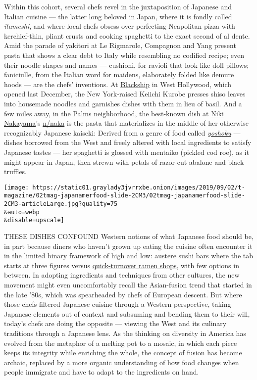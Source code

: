 Within this cohort, several chefs revel in the juxtaposition of Japanese
and Italian cuisine --- the latter long beloved in Japan, where it is
fondly called \emph{itameshi}, and where local chefs obsess over
perfecting Neapolitan pizza with kerchief-thin, pliant crusts and
cooking spaghetti to the exact second of al dente. Amid the parade of
yakitori at Le Rigmarole, Compagnon and Yang present pasta that shows a
clear debt to Italy while resembling no codified recipe; even their
noodle shapes and names --- cushioni, for ravioli that look like doll
pillows; faniciulle, from the Italian word for maidens, elaborately
folded like demure hoods --- are the chefs' inventions. At
\href{https://www.blackshipla.com/}{Blackship} in West Hollywood, which
opened last December, the New York-raised Keiichi Kurobe presses shiso
leaves into housemade noodles and garnishes dishes with them in lieu of
basil. And a few miles away, in the Palms neighborhood, the best-known
dish at
\href{https://www.nytimes3xbfgragh.onion/2018/05/16/t-magazine/food/female-chefs-rita-sodi-jody-williams-erika-nakamura.html}{Niki
Nakayama}'s \href{https://n-naka.com/}{n/naka} is the pasta that
materializes in the middle of her otherwise recognizably Japanese
kaiseki: Derived from a genre of food called
\href{https://www.nytimes3xbfgragh.onion/2008/03/26/dining/26japan.html}{\emph{yoshoku}}
--- dishes borrowed from the West and freely altered with local
ingredients to satisfy Japanese tastes --- her spaghetti is glossed with
mentaiko (pickled cod roe), as it might appear in Japan, then strewn
with petals of razor-cut abalone and black truffles.

\texttt{[image: https://static01.graylady3jvrrxbe.onion/images/2019/09/02/t-magazine/02tmag-japanamerfood-slide-2CM3/02tmag-japanamerfood-slide-2CM3-articleLarge.jpg?quality=75\\\&auto=webp\\\&disable=upscale]}

THESE DISHES CONFOUND Western notions of what Japanese food should be,
in part because diners who haven't grown up eating the cuisine often
encounter it in the limited binary framework of high and low: austere
sushi bars where the tab starts at three figures versus
\href{https://www.nytimes3xbfgragh.onion/2010/01/31/travel/31ramen.html}{quick-turnover
ramen shops}, with few options in between. In adopting ingredients and
techniques from other cultures, the new movement might even
uncomfortably recall the Asian-fusion trend that started in the late
'80s, which was spearheaded by chefs of European descent. But where
those chefs filtered Japanese cuisine through a Western perspective,
taking Japanese elements out of context and subsuming and bending them
to their will, today's chefs are doing the opposite --- viewing the West
and its culinary traditions through a Japanese lens. As the thinking on
diversity in America has evolved from the metaphor of a melting pot to a
mosaic, in which each piece keeps its integrity while enriching the
whole, the concept of fusion has become archaic, replaced by a more
organic understanding of how food changes when people immigrate and have
to adapt to the ingredients on hand.

